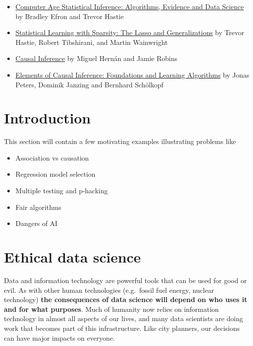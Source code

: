 \documentclass[]{book}
\providecommand{\tightlist}{%
  \setlength{\itemsep}{0pt}\setlength{\parskip}{0pt}}
\theoremstyle{definition}
\theoremstyle{definition}
\theoremstyle{definition}
\theoremstyle{remark}
\begin{document}
\begin{itemize}
\tightlist
\item
  \href{http://web.stanford.edu/~hastie/CASI/}{Computer Age Statistical
  Inference: Algorithms, Evidence and Data Science} by Bradley Efron and
  Trevor Hastie
\item
  \href{https://web.stanford.edu/~hastie/StatLearnSparsity/}{Statistical
  Learning with Sparsity: The Lasso and Generalizations} by Trevor
  Hastie, Robert Tibshirani, and Martin Wainwright
\item
  \href{https://www.hsph.harvard.edu/miguel-hernan/causal-inference-book/}{Causal
  Inference} by Miguel Hernán and Jamie Robins
\item
  \href{https://mitpress.mit.edu/books/elements-causal-inference}{Elements
  of Causal Inference: Foundations and Learning Algorithms} by Jonas
  Peters, Dominik Janzing and Bernhard Schölkopf
\end{itemize}

\chapter{Introduction}\label{intro}

This section will contain a few motivating examples illustrating
problems like

\begin{itemize}
\tightlist
\item
  Association vs causation
\item
  Regression model selection
\item
  Multiple testing and p-hacking
\item
  Fair algorithms
\item
  Dangers of AI
\end{itemize}

\chapter{Ethical data science}\label{ethical-data-science}

Data and information technology are powerful tools that can be used for
good or evil. As with other human technologies (e.g.~fossil fuel energy,
nuclear technology) \textbf{the consequences of data science will depend
on who uses it and for what purposes}. Much of humanity now relies on
information technology in almost all aspects of our lives, and many data
scientists are doing work that becomes part of this infrastructure. Like
city planners, our decisions can have major impacts on everyone.
\end{document}
